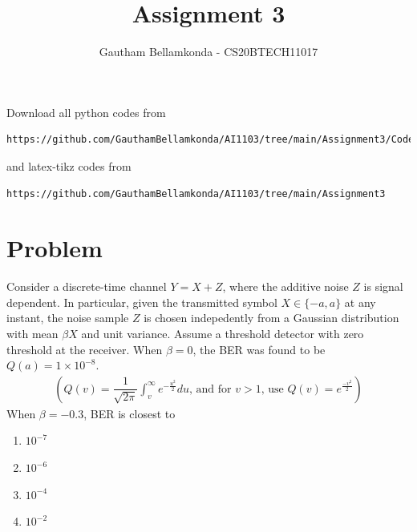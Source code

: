 \documentclass[journal,10pt,twocolumn]{IEEEtran}
\begin{document}
     \def\topbox#1{\raisebox{-\baselineskip}[0in][0in]{#1}}
     \def\midbox#1{\raisebox{-0.5\baselineskip}[0in][0in]{#1}}
\vspace{3cm}
\title{Assignment 3}
\author{Gautham Bellamkonda - CS20BTECH11017}
\maketitle
\newpage
\bigskip
\renewcommand{\thetable}{\theenumi}
Download all python codes from 
\begin{lstlisting}
https://github.com/GauthamBellamkonda/AI1103/tree/main/Assignment3/Codes
\end{lstlisting}
and latex-tikz codes from 
\begin{lstlisting}
https://github.com/GauthamBellamkonda/AI1103/tree/main/Assignment3
\end{lstlisting}
\section{Problem}
Consider a discrete-time channel $Y = X + Z$, where the additive noise $Z$ is signal dependent. In particular, given the transmitted symbol $X \in \{-a, a \}$ at any instant, the noise sample $Z$ is chosen indepedently from a Gaussian distribution with mean $\beta X$ and unit variance. Assume a threshold detector with zero threshold at the receiver. When $\beta = 0$, the BER was found to be $Q(a) = 1 \times 10^{-8}.$
\begin{align}
\left( Q(v) = \dfrac{1}{\sqrt{2 \pi}} \int_v ^{\infty} e^{-\frac{u^2}{2}} du \text{, and for } v > 1 \text{, use } Q(v) = e^{\frac{-v^2}{2}} \right)
\end{align}
When $\beta = -0.3$, BER is closest to
\begin{enumerate}[label = (\Alph*)]
\item $10^{-7}$
\item $10^{-6}$
\item $10^{-4}$ \label{option C}
\item $10^{-2}$
\end{enumerate}
\end{document}
